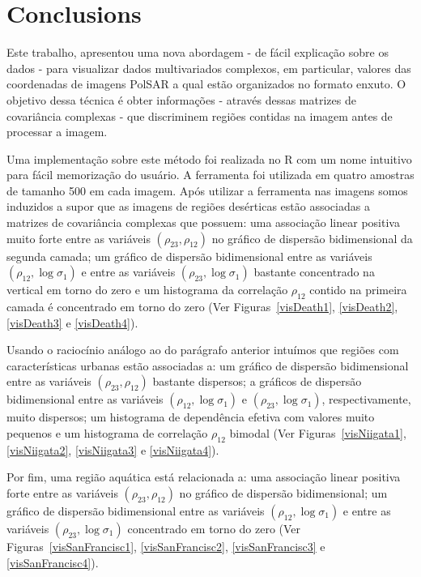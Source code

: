 \documentclass[journal]{IEEEtran}
\begin{document}

\section{Conclusions}\label{cinco}


Este trabalho, apresentou uma nova abordagem - de fácil explicação sobre os dados - para visualizar dados multivariados complexos, em particular, valores das coordenadas de imagens Pol{SAR} a qual estão organizados no formato enxuto. O objetivo dessa técnica é obter informações - através dessas matrizes de covariância complexas - que discriminem regiões contidas na imagem antes de processar a imagem. 

Uma implementação sobre este método foi realizada no R com um nome intuitivo para fácil memorização do usuário. A ferramenta foi utilizada em quatro amostras de tamanho 500 em cada imagem. Após utilizar a ferramenta nas imagens somos induzidos a supor que as imagens de regiões desérticas estão associadas a matrizes de covariância complexas que possuem: uma associação linear positiva muito forte entre as variáveis $(\rho_{23}, \rho_{12})$ no gráfico de dispersão bidimensional da segunda camada;   um gráfico de dispersão bidimensional entre as variáveis $(\rho_{12},\log\sigma_{1})$ e entre as variáveis $(\rho_{23},\log\sigma_{1})$ bastante concentrado na vertical em torno do zero e um histograma da correlação $\rho_{12}$ contido na primeira camada é concentrado em torno do zero (Ver Figuras~\ref{visDeath1}, \ref{visDeath2}, \ref{visDeath3} e \ref{visDeath4}). 

Usando o raciocínio análogo ao do parágrafo anterior intuímos que regiões com características urbanas estão associadas a: um gráfico de dispersão bidimensional entre as variáveis $(\rho_{23}, \rho_{12})$ bastante dispersos; a gráficos de dispersão bidimensional entre as variáveis $(\rho_{12},\log\sigma_{1})$ e $(\rho_{23},\log\sigma_{1})$, respectivamente, muito dispersos; um histograma de dependência efetiva com valores muito pequenos e um histograma de correlação $\rho_{12}$ bimodal (Ver Figuras~\ref{visNiigata1}, \ref{visNiigata2}, \ref{visNiigata3} e \ref{visNiigata4}).   

Por fim, uma região aquática está relacionada a: uma associação linear positiva forte entre as variáveis $(\rho_{23}, \rho_{12})$ no gráfico de dispersão bidimensional; um gráfico de dispersão bidimensional entre as variáveis $(\rho_{12},\log\sigma_{1})$ e entre as variáveis $(\rho_{23},\log\sigma_{1})$ concentrado em torno do zero (Ver Figuras~\ref{visSanFrancisc1}, \ref{visSanFrancisc2}, \ref{visSanFrancisc3} e \ref{visSanFrancisc4}).
\end{document}
